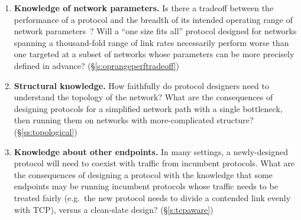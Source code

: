 \begin{enumerate}

\item \textbf{Knowledge of network parameters.} Is there a tradeoff
  between the performance of a protocol and the breadth of its
  intended operating range of network parameters~\cite{wroclawski}?
  Will a ``one size fits all'' protocol designed for networks spanning
  a thousand-fold range of link rates necessarily perform worse than
  one targeted at a subset of networks whose parameters can be more
  precisely defined in advance?  (\S\ref{s:oprangeperftradeoff})

\item \textbf{Structural knowledge.} How faithfully do protocol
  designers need to understand the topology of the network? What are
  the consequences of designing protocols for a simplified network
  path with a single bottleneck, then running them on networks with
  more-complicated structure?  (\S\ref{ss:topological})

\item \textbf{Knowledge about other endpoints.} In many settings, a
  newly-designed protocol will need to coexist with traffic from
  incumbent protocols. What are the consequences of designing a
  protocol with the knowledge that some endpoints may be running
  incumbent protocols whose traffic needs to be treated fairly
  (e.g.~the new protocol needs to divide a contended link evenly with
  TCP), versus a clean-slate design?  (\S\ref{s:tcpaware})



\end{enumerate}

